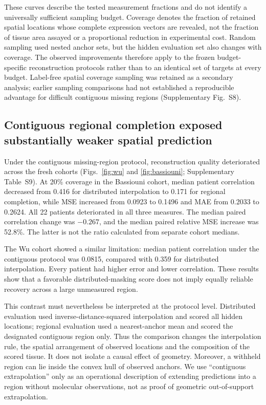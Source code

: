These curves describe the tested measurement fractions and do not identify a universally sufficient sampling budget. Coverage denotes the fraction of retained spatial locations whose complete expression vectors are revealed, not the fraction of tissue area assayed or a proportional reduction in experimental cost. Random sampling used nested anchor sets, but the hidden evaluation set also changes with coverage. The observed improvements therefore apply to the frozen budget-specific reconstruction protocols rather than to an identical set of targets at every budget. Label-free spatial coverage sampling was retained as a secondary analysis; earlier sampling comparisons had not established a reproducible advantage for difficult contiguous missing regions (Supplementary Fig.~S8).



\subsection{Contiguous regional completion exposed substantially weaker spatial prediction}
Under the contiguous missing-region protocol, reconstruction quality deteriorated across the fresh cohorts (Figs.~\ref{fig:wu} and \ref{fig:bassiouni}; Supplementary Table~S9). At 20\% coverage in the Bassiouni cohort, median patient correlation decreased from 0.416 for distributed interpolation to 0.171 for regional completion, while MSE increased from 0.0923 to 0.1496 and MAE from 0.2033 to 0.2624. All 22 patients deteriorated in all three measures. The median paired correlation change was $-0.267$, and the median paired relative MSE increase was 52.8\%. The latter is not the ratio calculated from separate cohort medians.

The Wu cohort showed a similar limitation: median patient correlation under the contiguous protocol was 0.0815, compared with 0.359 for distributed interpolation. Every patient had higher error and lower correlation. These results show that a favorable distributed-masking score does not imply equally reliable recovery across a large unmeasured region.

This contrast must nevertheless be interpreted at the protocol level. Distributed evaluation used inverse-distance-squared interpolation and scored all hidden locations; regional evaluation used a nearest-anchor mean and scored the designated contiguous region only. Thus the comparison changes the interpolation rule, the spatial arrangement of observed locations and the composition of the scored tissue. It does not isolate a causal effect of geometry. Moreover, a withheld region can lie inside the convex hull of observed anchors. We use ``contiguous extrapolation'' only as an operational description of extending predictions into a region without molecular observations, not as proof of geometric out-of-support extrapolation.

